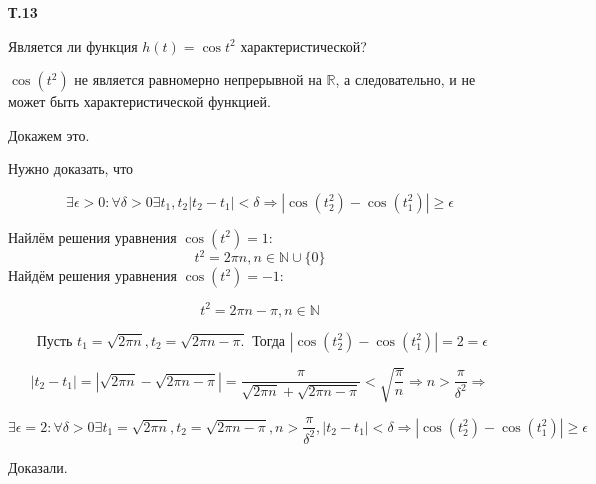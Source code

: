 \documentclass[a4paper,12pt]{article} %
\begin{document}
\begin{example} \textbf{Т.13 }

Является ли функция $h(t)=\cos t^{2}$ характеристической?



$\cos \left(t^{2}\right)$ не является равномерно непрерывной на $\mathbb{R}$, а следовательно, и не может быть характеристической функцией.

Докажем это.


Нужно доказать, что


\[ \exists \epsilon>0: \forall \delta>0 
\exists t_{1}, t_{2}\left|t_{2}-t_{1}\right|<\delta 
\Rightarrow\left|\cos \left(t_{2}^{2}\right)-\cos \left(t_{1}^{2}\right)\right| \geq \epsilon \]



Найлём решения уравнения $\cos \left(t^{2}\right)=1:$
$$
t^{2}=2 \pi n, n \in \mathbb{N} \cup\{0\}
$$
Найдём решения уравнения $\cos \left(t^{2}\right)=-1:$

\[ t^{2}=2 \pi n-\pi, n \in \mathbb{N} \]


$$
\text { Пусть } t_{1}=\sqrt{2 \pi n}, t_{2}=\sqrt{2 \pi n-\pi .} \text { Тогда }\left|\cos \left(t_{2}^{2}\right)-\cos \left(t_{1}^{2}\right)\right|=2=\epsilon
$$


\[ \left|t_{2}-t_{1}\right|
=
|\sqrt{2 \pi n}-\sqrt{2 \pi n-\pi}|
=
\frac{\pi}{\sqrt{2 \pi n}+\sqrt{2 \pi n-\pi}}
<
\sqrt{\frac{\pi}{n}} 
\Rightarrow 
n>\frac{\pi}{\delta^{2}} \Rightarrow \]



\[ \exists \epsilon=2: \forall \delta>0 \exists t_{1}=\sqrt{2 \pi n}, t_{2}
=
\sqrt{2 \pi n-\pi}, n>\frac{\pi}{\delta^{2}},\left|t_{2}-t_{1}\right|
<
\delta 
\Rightarrow
\left|\cos \left(t_{2}^{2}\right)-\cos \left(t_{1}^{2}\right)\right| 
\geq \epsilon \]


Доказали.




\end{example}
\end{document}
